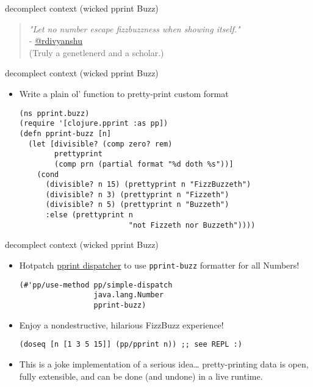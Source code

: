 \documentclass[presentation]{beamer}
\begin{document}
\begin{frame}[label={sec:orge9b0802}]{decomplect context (wicked pprint Buzz)}
\begin{verse}
\emph{"Let no number escape fizzbuzzness when showing itself."}\\
\vspace*{1em}
- \uline{\href{https://twitter.com/rdivyanshu}{@rdivyanshu}}\\
\vspace*{1em}
(Truly a genetlenerd and a scholar.)\\
\end{verse}
\end{frame}
\begin{frame}[label={sec:org164e993},fragile]{decomplect context (wicked pprint Buzz)}
 \begin{itemize}
\item Write a plain ol' function to pretty-print custom format
\begin{verbatim}
(ns pprint.buzz)
(require '[clojure.pprint :as pp])
(defn pprint-buzz [n]
  (let [divisible? (comp zero? rem)
        prettyprint
        (comp prn (partial format "%d doth %s"))]
    (cond
      (divisible? n 15) (prettyprint n "FizzBuzzeth")
      (divisible? n 3) (prettyprint n "Fizzeth")
      (divisible? n 5) (prettyprint n "Buzzeth")
      :else (prettyprint n
                         "not Fizzeth nor Buzzeth"))))
\end{verbatim}
\end{itemize}
\end{frame}
\begin{frame}[label={sec:org4038ae5},fragile]{decomplect context (wicked pprint Buzz)}
 \begin{itemize}
\item Hotpatch \href{https://github.com/clojure/clojure/blob/b1b88dd25373a86e41310a525a21b497799dbbf2/src/clj/clojure/pprint/dispatch.clj\#L175}{pprint dispatcher} to
use \texttt{pprint-buzz} formatter for all Numbers!
\begin{verbatim}
(#'pp/use-method pp/simple-dispatch
                 java.lang.Number
                 pprint-buzz)
\end{verbatim}
\item Enjoy a nondestructive, hilarious FizzBuzz experience!
\begin{verbatim}
(doseq [n [1 3 5 15]] (pp/pprint n)) ;; see REPL :)
\end{verbatim}
\item This is a joke implementation of a serious idea\ldots{}
pretty-printing data is open, fully extensible, and
can be done (and undone) in a live runtime.
\end{itemize}
\end{frame}
\end{document}
